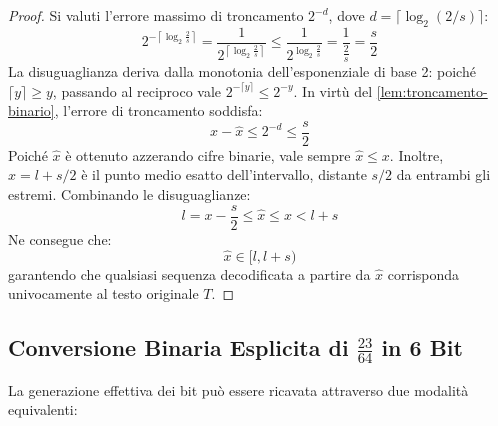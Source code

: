 \begin{proof}
Si valuti l'errore massimo di troncamento $2^{-d}$, dove $d = \lceil \log_2(2/s) \rceil$:
\begin{equation}
  2^{-\left\lceil \log_2 \frac{2}{s} \right\rceil} = \frac{1}{2^{\left\lceil \log_2 \frac{2}{s} \right\rceil}} \le \frac{1}{2^{\log_2 \frac{2}{s}}} = \frac{1}{\frac{2}{s}} = \frac{s}{2}
\end{equation}
La disuguaglianza deriva dalla monotonia dell'esponenziale di base 2: poich\'e $\lceil y \rceil \ge y$, passando al reciproco vale $2^{-\lceil y \rceil} \le 2^{-y}$. In virt\`u del \autoref{lem:troncamento-binario}, l'errore di troncamento soddisfa:
\begin{equation}
  x - \hat{x} \le 2^{-d} \le \frac{s}{2}
\end{equation}
Poich\'e $\hat{x}$ \`e ottenuto azzerando cifre binarie, vale sempre $\hat{x} \le x$. Inoltre, $x = l + s/2$ \`e il punto medio esatto dell'intervallo, distante $s/2$ da entrambi gli estremi. Combinando le disuguaglianze:
\begin{equation}
  l = x - \frac{s}{2} \le \hat{x} \le x < l + s
\end{equation}
Ne consegue che:
\begin{equation}
  \hat{x} \in [l, l + s)
\end{equation}
garantendo che qualsiasi sequenza decodificata a partire da $\hat{x}$ corrisponda univocamente al testo originale $T$.
\end{proof}

\FloatBarrier
\subsection{Conversione Binaria Esplicita di $\frac{23}{64}$ in 6 Bit}
\label{subsec:conversione-binaria-esplicita}

La generazione effettiva dei bit pu\`o essere ricavata attraverso due modalit\`a equivalenti:

